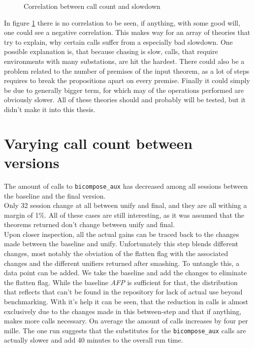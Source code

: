 \begin{figure}[ht]
\centering
\caption{Correlation between call count and slowdown}
\label{fig:correlation}
\end{figure}

In figure \ref{fig:correlation} there is no correlation to be seen, if anything, with some good will, one could see a negative correlation. This makes way for an array of theories that try to explain, why certain calls suffer from a especially bad slowdown. One possible explanation is, that because chasing is slow, calls, that require environments with many substations, are hit the hardest. There could also be a problem related to the number of premises of the input theorem, as a lot of steps requires to break the propositions apart on every premise. Finally it could simply be due to generally bigger term, for which may of the operations performed are obviously slower. All of these theories should and probably will be tested, but it didn't make it into this thesis.

\section{Varying call count between versions}

The amount of calls to \texttt{bicompose\_aux} has decreased among all sessions between the baseline and the final version.\\
Only 32 session change at all between unify and final, and they are all withing a margin of 1\%. All of these cases are still interesting, as it was assumed that the theorems returned don't change between unify and final.\\
Upon closer inspection, all the actual gains can be traced back to the changes made between the baseline and unify. Unfortunately this step blends different changes, most notably the obviation of the flatten flag with the associated changes and the different unifiers returned after smashing. To untangle this, a data point can be added. We take the baseline and add the changes to eliminate the flatten flag. While the baseline \textit{AFP} is sufficient for that, the distribution that reflects that can't be found in the repository for lack of actual use beyond benchmarking. With it's help it can be seen, that the reduction in calls is almost exclusively due to the changes made in this between-step and that if anything, makes more calls necessary. On average the amount of calls increases by four per mille. The one run suggests that the substitutes for the \texttt{bicompose\_aux} calls are actually slower and add 40 minutes to the overall run time.